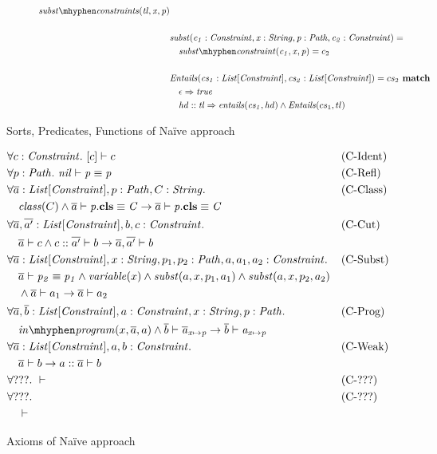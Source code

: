 \begin{figure}[t]
\begin{subfigure}[c]{1\textwidth}
\begin{align*}
{  \substconstrs{tl}{x}{p}}\\\\
&\mathit{subst(c_1: Constraint, x: String, p: Path, c_2: Constraint)} = \\
&\quad\substconstr{c_1}{x}{p} = c_2 \\\\
&\mathit{Entails(cs_1: List[Constraint], cs_2: List[Constraint])} = cs_2 \match\\
&\quad \case{\epsilon}{true}\\
&\quad \case{hd :: tl}{\mIt{entails}(cs_1, hd)} \land \mIt{Entails}(cs_1, tl)
\end{align*}
\label{subfig:axioms-naive-general-funs}
\end{subfigure}
\caption{Sorts, Predicates, Functions of Na\"ive approach}
\label{fig:axioms-naive-general}
\end{figure}

\begin{figure}
\begin{align*}
&\forall c: \Constr.\ \entails{[c]}{c} && \text{(C-Ident)} \\
&\forall p: \Path.\ \entails{\nil}{\pathEq{p}{p}} && \text{(C-Refl)} \\
&\forall \ovl{a}: \Constrs, p: \Path, C: \String.&& \text{(C-Class)} \\
&\quad \mIt{class}(C) \land \entails{\ovl{a}}{\instBy{p}{C}}
       \rightarrow \entails{\ovl{a}}{\instBy{p}{C}} \\
&\forall \ovl{a}, \ovl{a'}: \Constrs, b, c: \Constr. && \text{(C-Cut)} \\
&\quad \entails{\ovl a}{c} \land \entails{c :: \ovl{a'}}{b}
       \rightarrow \entails{\ovl a, \ovl{a'}}{b}\\
&\forall \ovl a: \Constrs, x: \String, p_1, p_2: \Path, a, a_1, a_2: \Constr. && \text{(C-Subst)} \\
&\quad \entails{\ovl a}{\pathEq{p_2}{p_1}} \land \mIt{variable}(x)
         \land \mIt{subst}(a, x, p_1, a_1) \land \mIt{subst}(a, x, p_2, a_2)\\
&\quad   \land \entails{\ovl a}{a_1}
       \rightarrow \entails{\ovl a}{a_2} \\
&\forall \ovl a, \ovl b: \Constrs, a: \Constr, x: \String, p: \Path. && \text{(C-Prog)} \\
&\quad \inprog(x, \ovl a, a) \land \entails{\ovl b}{\subst{\ovl a}{x}{p}}
       \rightarrow \entails{\ovl b}{\subst{a}{x}{p}} \\
&\forall \ovl a: \Constrs, a, b: \Constr. && \text{(C-Weak)} \\
&\quad \entails{\ovl a}{b}
       \rightarrow \entails{a :: \ovl a}{b}\\
&\forall ???.\ \entails{}{} && \text{(C-???)}\\
&\forall ???. && \text{(C-???)} \\
&\quad \entails{}{}
\end{align*}
\caption{Axioms of Na\"ive approach}
\label{fig:axioms-naive}
\end{figure}

